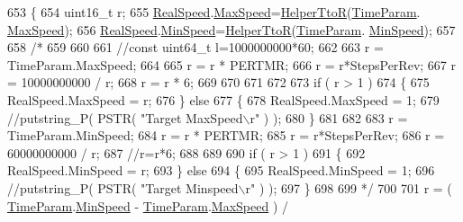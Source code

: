 \begin{DoxyCode}
653 \{
654     uint16\_t r;
655     \hyperlink{drv__8825_8c_a2e720ed1ed0ef90dba27c1f246048dcd}{RealSpeed}.\hyperlink{structMotor__Parameters_a501458e333945f49f03c295e2f49e3b9}{MaxSpeed}=\hyperlink{group__DRV8825_gabc1e78364b977fdff7ae3b642e720f58}{HelperTtoR}(\hyperlink{drv__8825_8c_a7d20b8cec6f96108790d4bf76b9c469d}{TimeParam}.
      \hyperlink{structMotor__Parameters_a501458e333945f49f03c295e2f49e3b9}{MaxSpeed});
656     \hyperlink{drv__8825_8c_a2e720ed1ed0ef90dba27c1f246048dcd}{RealSpeed}.\hyperlink{structMotor__Parameters_aaf0ac3ed818f5c89cc86ea1d9174dc43}{MinSpeed}=\hyperlink{group__DRV8825_gabc1e78364b977fdff7ae3b642e720f58}{HelperTtoR}(\hyperlink{drv__8825_8c_a7d20b8cec6f96108790d4bf76b9c469d}{TimeParam}.
      \hyperlink{structMotor__Parameters_aaf0ac3ed818f5c89cc86ea1d9174dc43}{MinSpeed});
657 
658 \textcolor{comment}{/*}
659 \textcolor{comment}{    }
660 \textcolor{comment}{}
661 \textcolor{comment}{    //const uint64\_t l=1000000000*60;}
662 \textcolor{comment}{}
663 \textcolor{comment}{    r = TimeParam.MaxSpeed;}
664 \textcolor{comment}{}
665 \textcolor{comment}{    r = r * PERTMR;}
666 \textcolor{comment}{    r = r*StepsPerRev;}
667 \textcolor{comment}{    r = 10000000000 / r;}
668 \textcolor{comment}{    r = r * 6;}
669 \textcolor{comment}{}
670 \textcolor{comment}{}
671 \textcolor{comment}{}
672 \textcolor{comment}{}
673 \textcolor{comment}{    if ( r > 1 )}
674 \textcolor{comment}{    \{}
675 \textcolor{comment}{        RealSpeed.MaxSpeed = r;}
676 \textcolor{comment}{    \} else}
677 \textcolor{comment}{    \{}
678 \textcolor{comment}{        RealSpeed.MaxSpeed = 1;}
679 \textcolor{comment}{        //putstring\_P( PSTR( "Target MaxSpeed\(\backslash\)r" ) );}
680 \textcolor{comment}{    \}}
681 \textcolor{comment}{}
682 \textcolor{comment}{}
683 \textcolor{comment}{    r = TimeParam.MinSpeed;}
684 \textcolor{comment}{    r = r * PERTMR;}
685 \textcolor{comment}{    r = r*StepsPerRev;}
686 \textcolor{comment}{    r = 60000000000 / r;}
687 \textcolor{comment}{    //r=r*6;}
688 \textcolor{comment}{}
689 \textcolor{comment}{}
690 \textcolor{comment}{    if ( r > 1 )}
691 \textcolor{comment}{    \{}
692 \textcolor{comment}{        RealSpeed.MinSpeed = r;}
693 \textcolor{comment}{    \} else}
694 \textcolor{comment}{    \{}
695 \textcolor{comment}{        RealSpeed.MinSpeed = 1;}
696 \textcolor{comment}{        //putstring\_P( PSTR( "Target Minspeed\(\backslash\)r" ) );}
697 \textcolor{comment}{    \}}
698 \textcolor{comment}{}
699 \textcolor{comment}{*/}
700 
701     r = ( \hyperlink{drv__8825_8c_a7d20b8cec6f96108790d4bf76b9c469d}{TimeParam}.\hyperlink{structMotor__Parameters_aaf0ac3ed818f5c89cc86ea1d9174dc43}{MinSpeed} - \hyperlink{drv__8825_8c_a7d20b8cec6f96108790d4bf76b9c469d}{TimeParam}.\hyperlink{structMotor__Parameters_a501458e333945f49f03c295e2f49e3b9}{MaxSpeed} ) / 

\end{DoxyCode}
